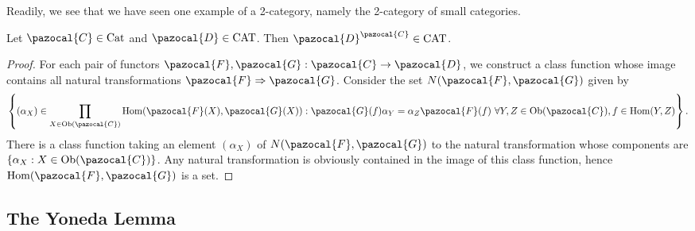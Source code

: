 Readily, we see that we have seen one example of a 2-category, namely the 2-category of small categories. 
\begin{proposition}
    Let $\pazocal{C}\in \mathrm{Cat}$ and $\pazocal{D}\in \mathrm{CAT}$. Then $\pazocal{D}^\pazocal{C}\in \mathrm{CAT}$.  
\end{proposition}
\begin{proof}
    For each pair of functors $\pazocal{F},\pazocal{G}:\pazocal{C}\rightarrow \pazocal{D}$, we construct a class function whose image contains all natural transformations $\pazocal{F}\Rightarrow \pazocal{G}$. Consider the set $N(\pazocal{F},\pazocal{G})$ given by
    \begin{align*} 
        \left\{(\alpha_X) \in \prod_{X\in \Ob(\pazocal{C})} \Hom(\pazocal{F}(X),\pazocal{G}(X)) : \pazocal{G}(f)\alpha_Y  =\alpha_Z\pazocal{F}(f)\ \forall Y,Z\in \Ob(\pazocal{C}), f\in \Hom(Y,Z)  \right\}.
    \end{align*}
    There is a class function taking an element $(\alpha_X)$ of $N(\pazocal{F},\pazocal{G})$ to the natural transformation whose components are $\{\alpha_X : X\in \Ob(\pazocal{C})\}$. Any natural transformation is obviously contained in the image of this class function,  hence $\Hom(\pazocal{F},\pazocal{G})$ is a set. 
\end{proof}
\subsection{The Yoneda Lemma}
